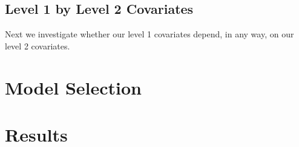 \documentclass[12pt,twoside,leqno,fleqn,letterpaper]{article}
\theoremstyle{definition}
\theoremstyle{definition}
\newcommand{\detailtexcount}[1]{ %
\immediate\write18{texcount -merge -sum #1.tex > #1.wcdetail }%
%
}
\begin{document}
\subsection{Level 1 by Level 2 Covariates}

Next we investigate whether our level 1 covariates depend, in any way, on our level 2 covariates. 

\section{Model Selection}


\section{Results}

\singlespacing
% 
% 
\printbibliography
\end{document}

